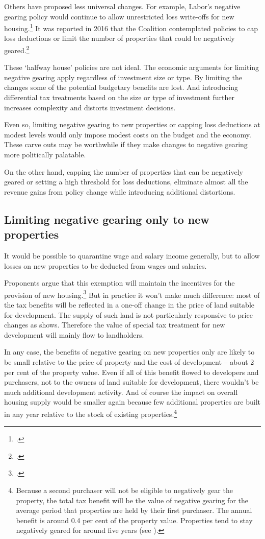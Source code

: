 Others have proposed less universal changes. For example, Labor’s negative gearing policy would continue to allow unrestricted loss write-offs for new housing.\footcite{ALP2016PositivePlanHousing} It was reported in 2016 that the Coalition contemplated policies to cap loss deductions or limit the number of properties that could be negatively geared.\footcite{Coorey2016}  

These ‘halfway house’ policies are not ideal. The economic arguments for limiting negative gearing apply regardless of investment size or type. By limiting the changes some of the potential budgetary benefits are lost. And introducing differential tax treatments based on the size or type of investment further increases complexity and distorts investment decisions. 

Even so, limiting negative gearing to new properties or capping loss deductions at modest levels would only impose modest costs on the budget and the economy. These carve outs may be worthwhile if they make changes to negative gearing more politically palatable.

On the other hand, capping the number of properties that can be negatively geared or setting a high threshold for loss deductions, eliminate almost all the revenue gains from policy change while introducing additional distortions. 

\subsection{Limiting negative gearing only to new properties}
It would be possible to quarantine wage and salary income generally, but to allow losses on new properties to be deducted from wages and salaries. 

Proponents argue that this exemption will maintain the incentives for the provision of new housing.\footcite[][28]{McKellInstitute2015SwitchingGears}  But in practice it won’t make much difference: most of the tax benefits will be reflected in a one-off change in the price of land suitable for development. The supply of such land is not particularly responsive to price changes as  shows. Therefore the value of special tax treatment for new development will mainly flow to landholders. 

In any case, the benefits of negative gearing on new properties only are likely to be small relative to the price of property and the cost of development – about 2 per cent of the property value.  Even if all of this benefit flowed to developers and purchasers, not to the owners of land suitable for development, there wouldn’t be much additional development activity. And of course the impact on overall housing supply would be smaller again because few additional properties are built in any year relative to the stock of existing properties.\footnote{Because a second purchaser will not be eligible to negatively gear the property, the total tax benefit will be the value of negative gearing for the average period that properties are held by their first purchaser. The annual benefit is around 0.4 per cent of the property value. Properties tend to stay negatively geared for around five years (see \stopifendnote{}).} 

